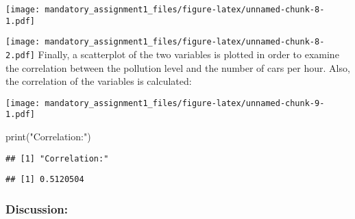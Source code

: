 \documentclass[
]{article}
\newenvironment{Shaded}{\begin{snugshade}}{\end{snugshade}}
\newcommand{\FunctionTok}[1]{\textcolor[rgb]{0.00,0.00,0.00}{#1}}
\newcommand{\NormalTok}[1]{#1}
\newcommand{\SpecialCharTok}[1]{\textcolor[rgb]{0.00,0.00,0.00}{#1}}
\newcommand{\StringTok}[1]{\textcolor[rgb]{0.31,0.60,0.02}{#1}}
\begin{document}
\texttt{[image: mandatory\_assignment1\_files/figure-latex/unnamed-chunk-8-1.pdf]}

\begin{Shaded}
\end{Shaded}

\texttt{[image: mandatory\_assignment1\_files/figure-latex/unnamed-chunk-8-2.pdf]}
Finally, a scatterplot of the two variables is plotted in order to
examine the correlation between the pollution level and the number of
cars per hour. Also, the correlation of the variables is calculated:

\begin{Shaded}
\end{Shaded}

\texttt{[image: mandatory\_assignment1\_files/figure-latex/unnamed-chunk-9-1.pdf]}

\begin{Shaded}
\begin{Highlighting}[]
\FunctionTok{print}\NormalTok{(}\StringTok{"Correlation:"}\NormalTok{)}
\end{Highlighting}
\end{Shaded}

\begin{verbatim}
## [1] "Correlation:"
\end{verbatim}

\begin{Shaded}
\end{Shaded}

\begin{verbatim}
## [1] 0.5120504
\end{verbatim}

\hypertarget{discussion}{%
\subsubsection{Discussion:}\label{discussion}}
\end{document}
